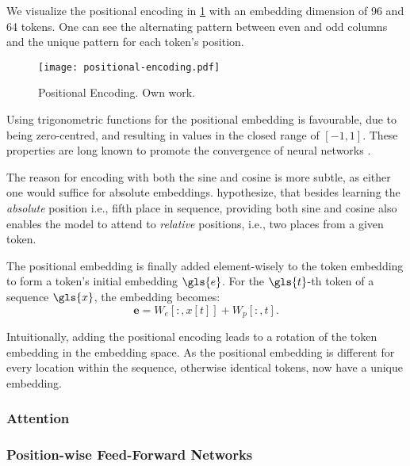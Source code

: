 We visualize the positional encoding in \cref{fig:positional-embedding} with an embedding dimension of 96 and 64 tokens. One can see the alternating pattern between even and odd columns and the unique pattern for each token's position. 

\begin{figure}[h]
  \begin{center}
    \texttt{[image: positional-encoding.pdf]}
  \end{center}
  \caption[Positional Encoding]{Positional Encoding. Own work.}
  \label{fig:positional-embedding}
\end{figure}

Using trigonometric functions for the positional embedding is favourable, due to being zero-centred, and resulting in values in the closed range of $[-1,1]$. These properties are long known to promote the convergence of neural networks \autocites[][8-9]{lecunEfficientBackProp2012}[][2]{ioffeBatchNormalizationAccelerating2015}.

The reason for encoding with both the sine and cosine is more subtle, as either one would suffice for absolute embeddings. \textcite[][6]{vaswaniAttentionAllYou2017} hypothesize, that besides learning the \emph{absolute} position i.e., fifth place in sequence, providing both sine and cosine also enables the model to attend to \emph{relative} positions, i.e., two places from a given token.

The positional embedding is finally added element-wisely to the token embedding to form a token's initial embedding $\gls{e}$. For the $\gls{t}$-th token of a sequence $\gls{x}$, the embedding becomes:
\begin{equation}
  \boldsymbol{e}=W_e[:, x[t]]+W_p[:, t].
  \label{eq:positional-embedding}
\end{equation}

Intuitionally, adding the positional encoding leads to a rotation of the token embedding in the embedding space. As the positional embedding is different for every location within the sequence, otherwise identical tokens, now have a unique embedding.

\subsubsection{Attention}\label{sec:attention}

\subsubsection{Position-wise Feed-Forward Networks}\label{sec:position-wise-ffn}

